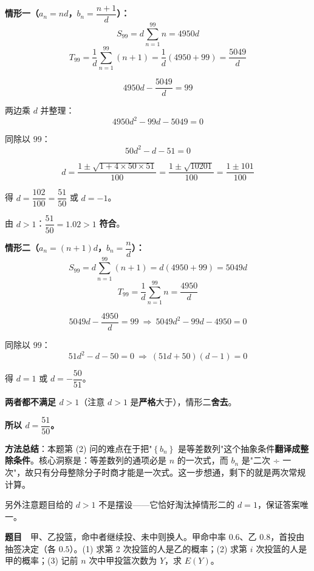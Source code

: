 \par\medskip

\textbf{情形一（$a_n=nd$，$b_n=\dfrac{n+1}d$）：}
\[S_{99}=d\sum_{n=1}^{99}n=4950d\]
\[T_{99}=\frac1d\sum_{n=1}^{99}(n+1)=\frac1d\left(4950+99\right)=\frac{5049}d\]

\[4950d-\frac{5049}d=99\]

两边乘 $d$ 并整理：
\[4950d^{2}-99d-5049=0\]

同除以 $99$：
\[50d^{2}-d-51=0\]

\[d=\frac{1\pm\sqrt{1+4\times50\times51}}{100}=\frac{1\pm\sqrt{10201}}{100}=\frac{1\pm101}{100}\]

得 $d=\dfrac{102}{100}=\dfrac{51}{50}$ 或 $d=-1$。

由 $d>1$：$\dfrac{51}{50}=1.02>1$  \textbf{符合}。

\par\medskip

\textbf{情形二（$a_n=(n+1)d$，$b_n=\dfrac nd$）：}
\[S_{99}=d\sum_{n=1}^{99}(n+1)=d\left(4950+99\right)=5049d\]
\[T_{99}=\frac1d\sum_{n=1}^{99}n=\frac{4950}d\]

\[5049d-\frac{4950}d=99\ \Longrightarrow\ 5049d^{2}-99d-4950=0\]

同除以 $99$：
\[51d^{2}-d-50=0\ \Longrightarrow\ (51d+50)(d-1)=0\]

得 $d=1$ 或 $d=-\dfrac{50}{51}$。

\textbf{两者都不满足 $d>1$}（注意 $d>1$ 是\textbf{严格}大于），情形二\textbf{舍去}。

\textbf{所以 $d=\dfrac{51}{50}$。}

\begin{gktip}
\textbf{方法总结}：本题第 (2) 问的难点在于把"$\left\{b_n\right\}$ 是等差数列"这个抽象条件\textbf{翻译成整除条件}。核心洞察是：等差数列的通项必是 $n$ 的一次式，而 $b_n$ 是"二次 ÷ 一次"，故只有分母整除分子时商才能是一次式。这一步想通，剩下的就是两次常规计算。

另外注意题目给的 $d>1$ 不是摆设——它恰好淘汰掉情形二的 $d=1$，保证答案唯一。
\end{gktip}

\par\medskip


\textbf{题目}　甲、乙投篮，命中者继续投、未中则换人。甲命中率 $0.6$、乙 $0.8$，首投由抽签决定（各 $0.5$）。(1) 求第 2 次投篮的人是乙的概率；(2) 求第 $i$ 次投篮的人是甲的概率；(3) 记前 $n$ 次中甲投篮次数为 $Y$，求 $E(Y)$。

\par\medskip

